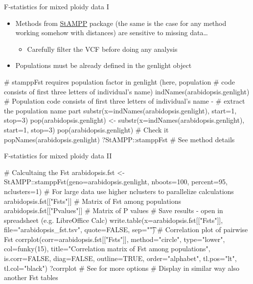 \documentclass[compress, ucs, xelatex, 11pt, xcolor=svgnames, aspectratio=169,
	hyperref={
		bookmarks=true,
		unicode=true,
		colorlinks=true,
		pdftitle={Molecular data in R},
		plainpages=false,
		pdfauthor={Vojtech Zeisek},
		pdfsubject={Course about phylogeny and evolution in R},
		pdfcreator={XeLaTeX},
		pdfkeywords={R, evolution, phylogeny, molecular data},
		linkcolor=Crimson, %
		anchorcolor=Magenta, %
		citecolor=Magenta, %
		filecolor=Magenta, %
		menucolor=Magenta, %
		urlcolor=DodgerBlue, %
		pdftex},
	url={hyphens, lowtilde} %
	]{beamer}
\begin{document}
\begin{frame}[fragile]{F-statistics for mixed ploidy data I}
	\begin{itemize}
		\item Methods from \href{https://CRAN.R-project.org/package=StAMPP}{StAMPP} package (the same is the case for any method working somehow with distances) are sensitive to missing data\ldots
		\begin{itemize}
			\item Carefully filter the VCF before doing any analysis
		\end{itemize}
		\item Populations must be already defined in the genlight object
	\end{itemize}
	\begin{spluscode}
    # stamppFst requires population factor in genlight (here, population
    # code consists of first three letters of individual's name)
    indNames(arabidopsis.genlight)
    # Population code consists of first three letters of individual's name -
    # extract the population name part
    substr(x=indNames(arabidopsis.genlight), start=1, stop=3)
    pop(arabidopsis.genlight) <- substr(x=indNames(arabidopsis.genlight),
      start=1, stop=3)
    pop(arabidopsis.genlight) # Check it
    popNames(arabidopsis.genlight)
    ?StAMPP::stamppFst # See method details
	\end{spluscode}
\end{frame}

\begin{frame}[fragile]{F-statistics for mixed ploidy data II}
	\begin{spluscode}
    # Calcultaing the Fst
    arabidopsis.fst <- StAMPP::stamppFst(geno=arabidopsis.genlight,
      nboots=100, percent=95, nclusters=1)
    # For large data use higher nclusters to parallelize calculations
    arabidopsis.fst[["Fsts"]] # Matrix of Fst among populations
    arabidopsis.fst[["Pvalues"]] # Matrix of P values
    # Save results - open in spreadsheet (e.g. LibreOffice Calc)
    write.table(x=arabidopsis.fst[["Fsts"]], file="arabidopsis_fst.tsv",
      quote=FALSE, sep="\t")
    # Correlation plot of pairwise Fst
    corrplot(corr=arabidopsis.fst[["Fsts"]], method="circle", type="lower",
      col=funky(15), title="Correlation matrix of Fst among populations",
      is.corr=FALSE, diag=FALSE, outline=TRUE, order="alphabet", tl.pos="lt",
      tl.col="black")
    ?corrplot # See for more options
    # Display in similar way also another Fst tables
	\end{spluscode}
\end{frame}
\end{document}
